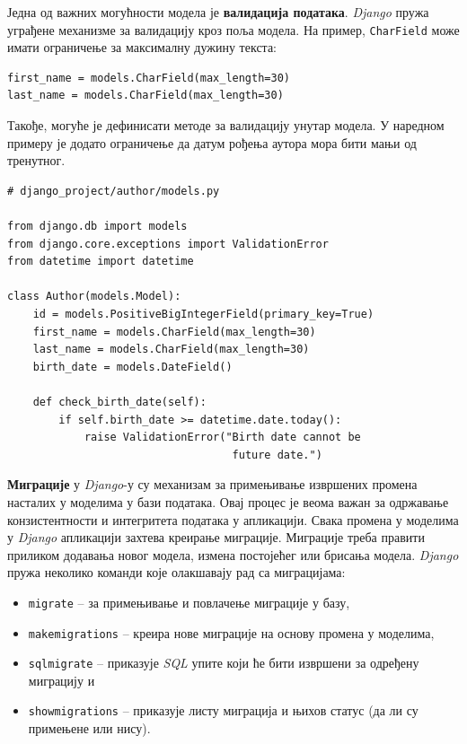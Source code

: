 \documentclass[12pt,oneside]{memoir}
\begin{document}
\vspace{0.5cm}
Једна од важних могућности модела је \textbf{валидација података}. \textit{Django} пружа уграђене механизме за валидацију кроз поља модела. На пример, \texttt{CharField} може имати ограничење за максималну дужину текста:

\begin{lstlisting}
first_name = models.CharField(max_length=30)
last_name = models.CharField(max_length=30)
\end{lstlisting}

Такође, могуће је дефинисати методе за валидацију унутар модела. У наредном примеру је додато ограничење да датум рођења аутора мора бити мањи од тренутног.

\begin{lstlisting}
# django_project/author/models.py

from django.db import models
from django.core.exceptions import ValidationError
from datetime import datetime

class Author(models.Model):
    id = models.PositiveBigIntegerField(primary_key=True)
    first_name = models.CharField(max_length=30)
    last_name = models.CharField(max_length=30)
    birth_date = models.DateField()

    def check_birth_date(self):
        if self.birth_date >= datetime.date.today():
            raise ValidationError("Birth date cannot be 
                                   future date.")
\end{lstlisting}

\vspace{0.5cm}
\textbf{Миграције} у \textit{Django}-у \cite{django_doc_migrations} су механизам за примењивање извршених промена насталих у моделима у бази података. Овај процес је веома важан за одржавање конзистентности и интегритета података у апликацији. Свака промена у моделима у \textit{Django} апликацији захтева креирање миграције. Миграције треба правити приликом додавања новог модела, измена постојећег или брисања модела. \textit{Django} пружа неколико команди које олакшавају рад са миграцијама:

\begin{itemize}[--]
    \item \texttt{migrate} -- за примењивање и повлачење миграције у базу,
    \item \texttt{makemigrations} -- креира нове миграције на основу промена у моделима,
    \item \texttt{sqlmigrate} -- приказује \textit{SQL} упите који ће бити извршени за одређену миграцију и
    \item \texttt{showmigrations} -- приказује листу миграција и њихов статус (да ли су примењене или нису).
\end{itemize}
\end{document}
